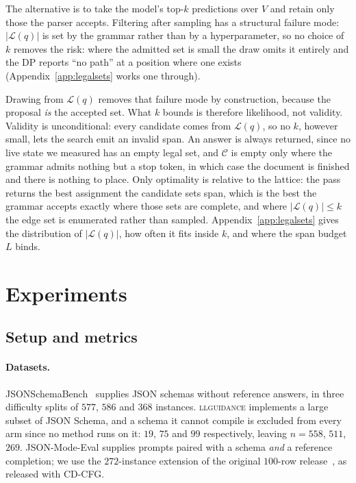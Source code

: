\documentclass{article}
\begin{document}
The alternative is to take the model's top-$k$ predictions over $V$ and retain
only those the parser accepts. Filtering after sampling has a structural failure
mode: $|\mathcal{L}(q)|$ is set by the grammar rather than by a hyperparameter,
so no choice of $k$ removes the risk: where the admitted set is small the draw
omits it entirely and the DP reports ``no path'' at a position where one exists
(Appendix~\ref{app:legalsets} works one through).

Drawing from $\mathcal{L}(q)$ removes that failure mode by construction, because
the proposal \emph{is} the accepted set. What $k$ bounds is therefore
likelihood, not validity.
Validity is unconditional: every candidate comes from $\mathcal{L}(q)$, so no
$k$, however small, lets the search emit an invalid span. An answer is always
returned, since no live state we measured has an empty legal set, and
$\mathcal{C}$ is empty only where the grammar admits nothing but a stop token, in
which case the document is finished and there is nothing to place. Only
optimality is relative to the lattice: the pass returns the best assignment the
candidate sets span, which is the best the grammar accepts exactly where those
sets are complete, and where $|\mathcal{L}(q)|\le k$ the edge set is enumerated
rather than sampled. Appendix~\ref{app:legalsets} gives the distribution of
$|\mathcal{L}(q)|$, how often it fits inside $k$, and where the span budget $L$
binds. 
\section{Experiments}
\label{sec:metric}

\subsection{Setup and metrics}

\paragraph{Datasets.}
JSONSchemaBench~\citep{geng2025jsonschemabenchrigorousbenchmarkstructured}
supplies JSON schemas without reference answers, in three difficulty splits of
$577$, $586$ and $368$ instances. \textsc{llguidance} implements a large subset of JSON Schema, and a schema it
cannot compile is excluded from every arm since no method runs on it: $19$, $75$ and $99$ respectively,
leaving $n=558$, $511$, $269$. JSON-Mode-Eval supplies prompts paired with a schema \emph{and} a reference
completion; we use the $272$-instance extension
\citep{ethsri2025jsonmodeevalextended} of the original $100$-row
release~\citep{nousresearch2024jsonmodeeval}, as released with CD-CFG.
\end{document}

